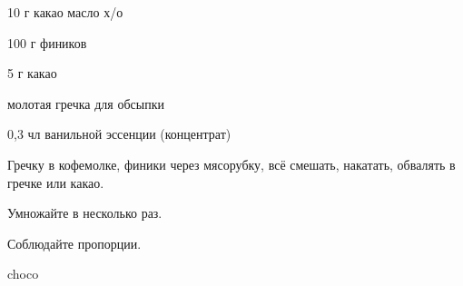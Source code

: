 {
\item 10 г какао масло х/о
\item 100 г фиников
\item 5 г какао 
\item молотая гречка для обсыпки
}{
\item  0,3 чл ванильной эссенции (концентрат)
}{
Гречку в кофемолке, финики через мясорубку, всё смешать, накатать, обвалять в гречке или какао. 
}{
\begin{advice}
\item Умножайте в несколько раз.
\item Соблюдайте пропорции.
\end{advice}}{choco}







% 
% 
% 










